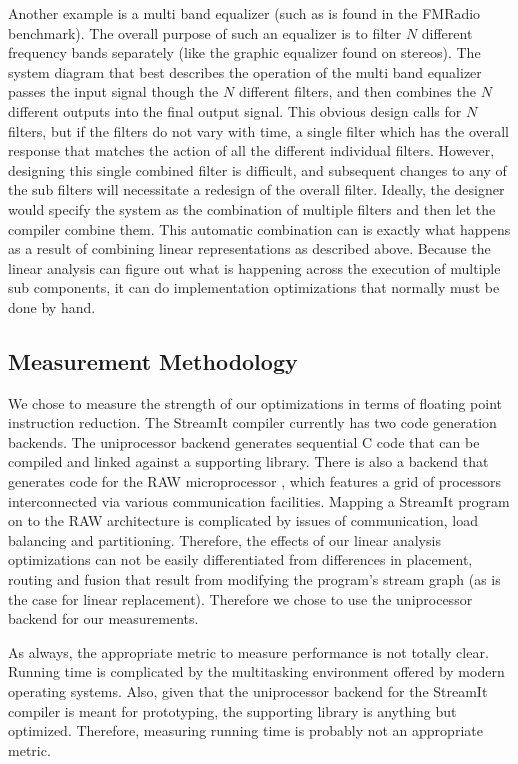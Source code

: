 Another example is a multi band equalizer (such as is found in the FMRadio benchmark). 
The overall purpose of such an equalizer is to filter $N$ different frequency bands 
separately (like the graphic equalizer found on stereos). 
The system diagram that best describes the operation of the multi band equalizer
passes the input signal though the $N$ different filters, and then combines the $N$
different outputs into the final output signal.
This obvious design calls for $N$ filters, but if the filters do not vary with time, 
a single filter which has the overall response that matches the action of all the 
different individual filters. However, designing this single combined filter is 
difficult, and subsequent changes to any of the sub filters will necessitate a
redesign of the overall filter. Ideally, the designer would specify the system as
the combination of multiple filters and then let the compiler combine them. 
This automatic combination can is exactly what happens as a result of combining
linear representations as described above. Because the linear analysis can
figure out what is happening across the execution of multiple sub components, 
it can do implementation optimizations that normally must be done by hand.

\subsection{Measurement Methodology}
We chose to measure the strength of our optimizations in terms of 
floating point instruction reduction. The StreamIt compiler currently
has two code generation backends. The uniprocessor backend generates sequential C code
that can be compiled and linked against a supporting library. 
There is also a backend that generates code for the RAW microprocessor
\cite{waingold97baring, raw-micro}, which features
a grid of processors interconnected via various communication facilities. 
Mapping a StreamIt program on to the RAW architecture is complicated
by issues of communication, load balancing and partitioning\cite{streamit-asplos}. 
Therefore, the effects of our linear analysis optimizations can not
be easily differentiated from differences in placement, routing and fusion that result
from modifying the program's stream graph (as is the case for linear replacement). 
Therefore we chose to use the uniprocessor backend for our measurements.

As always, the appropriate metric to measure performance is not totally clear. 
Running time is complicated by the multitasking environment offered by 
modern operating systems. Also, given that the uniprocessor backend for
the StreamIt compiler is meant for prototyping, the supporting 
library is anything but optimized. Therefore, measuring running time is
probably not an appropriate metric.

